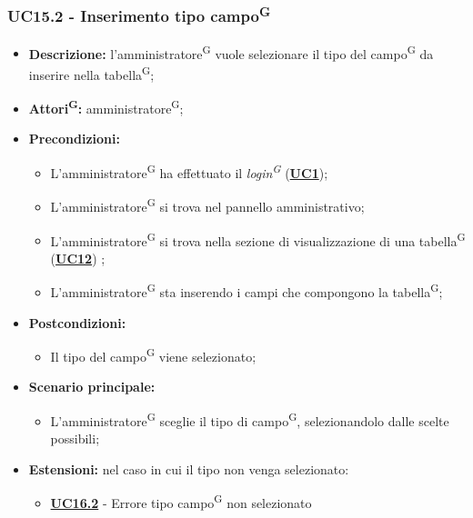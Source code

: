 \subsubsection{UC15.2 - Inserimento tipo campo\textsuperscript{G}}
\label{sec:UC15.2}
\begin{itemize}
	\item \textbf{Descrizione:} l’amministratore\textsuperscript{G} vuole selezionare il tipo del campo\textsuperscript{G} da inserire nella tabella\textsuperscript{G};
	\item \textbf{Attori\textsuperscript{G}:} amministratore\textsuperscript{G};
	\item \textbf{Precondizioni:} 
	\begin{itemize}
		\item L’amministratore\textsuperscript{G} ha effettuato il \textit{login\textsuperscript{G}} (\hyperref[sec:UC1]{\textbf{UC1}});
		\item L’amministratore\textsuperscript{G} si trova nel pannello amministrativo;
		\item L’amministratore\textsuperscript{G} si trova nella sezione di visualizzazione di una tabella\textsuperscript{G} (\hyperref[sec:UC12]{\textbf{UC12}}) ;
		\item L’amministratore\textsuperscript{G} sta inserendo i campi che compongono la tabella\textsuperscript{G};
	\end{itemize}
	\item \textbf{Postcondizioni:} 
	\begin{itemize}
		\item Il tipo del campo\textsuperscript{G} viene selezionato;
	\end{itemize}
	\item \textbf{Scenario principale:} 
	\begin{itemize}
		\item L’amministratore\textsuperscript{G} sceglie il tipo di campo\textsuperscript{G}, selezionandolo dalle scelte possibili;
	\end{itemize}
	\item \textbf{Estensioni:} nel caso in cui il tipo non venga selezionato:
	\begin{itemize}
		\item \hyperref[sec:UC16.2]{\textbf{UC16.2}} - Errore tipo campo\textsuperscript{G} non selezionato
	\end{itemize}
\end{itemize}

